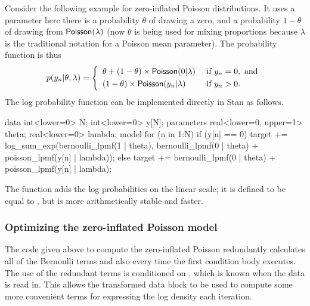 Consider the following example for zero-inflated Poisson
distributions.  It uses a parameter  here there is a
probability $\theta$ of drawing a zero, and a probability $1 - \theta$
of drawing from $\mbox{\sf Poisson}(\lambda)$ (now $\theta$ is being
used for mixing proportions because $\lambda$ is the traditional
notation for a Poisson mean parameter).  The probability function is
thus
\[
p(y_n|\theta,\lambda)
=
\left\{
\begin{array}{ll}
\theta + (1 - \theta) \times \mbox{\sf Poisson}(0|\lambda) & \mbox{ if } y_n = 0, \mbox{ and}
\\[3pt]
(1-\theta) \times \mbox{\sf Poisson}(y_n|\lambda) & \mbox{ if } y_n > 0.
\end{array}
\right.
\]
%
The log probability function can be implemented directly in Stan as follows.
%
\begin{stancode}
data {
  int<lower=0> N;
  int<lower=0> y[N];
}
parameters {
  real<lower=0, upper=1> theta;
  real<lower=0> lambda;
}
model {
  for (n in 1:N) {
    if (y[n] == 0)
      target += log_sum_exp(bernoulli_lpmf(1 | theta),
                            bernoulli_lpmf(0 | theta)
                              + poisson_lpmf(y[n] | lambda));
    else
      target += bernoulli_lpmf(0 | theta)
                  + poisson_lpmf(y[n] | lambda);
  }
}
\end{stancode}
%
The  function adds the log probabilities
on the linear scale; it is defined to be equal to , but is more arithmetically stable and faster.  

\subsubsection{Optimizing the zero-inflated Poisson model}

The code given above to compute the zero-inflated Poisson 
redundantly calculates all of the Bernoulli terms and also
 every time the first condition
body executes.  The use of the redundant terms is conditioned on
, which is known when the data is read in.  This allows
the transformed data block to be used to compute some more convenient
terms for expressing the log density each iteration.  

